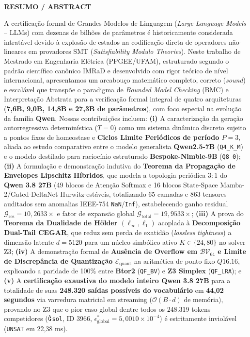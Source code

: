 \documentclass[11pt,a4paper]{article}
\theoremstyle{definition}
\begin{document}
\begin{titlepage}
    \vspace{0.55cm}
    \begin{minipage}{0.98\textwidth}
        \footnotesize
        \begin{center}\textbf{RESUMO / ABSTRACT}\end{center}
        \noindent A certificação formal de Grandes Modelos de Linguagem (\textit{Large Language Models} -- LLMs) com dezenas de bilhões de parâmetros é historicamente considerada intratável devido à explosão de estados na codificação direta de operadores não-lineares em provadores SMT (\textit{Satisfiability Modulo Theories}). Neste trabalho de Mestrado em Engenharia Elétrica (PPGEE/UFAM), estruturado segundo o padrão científico canônico IMRaD e desenvolvido com rigor teórico de nível internacional, apresentamos um arcabouço matemático completo, correto (\textit{sound}) e escalável que transpõe o paradigma de \textit{Bounded Model Checking} (BMC) e Interpretação Abstrata para a verificação formal integral de quatro arquiteturas (\textbf{7,6B, 9,0B, 14,8B e 27,3B de parâmetros}), com foco especial na evolução da família \textbf{Qwen}. Nossas contribuições incluem: \textbf{(i)} A caracterização da geração autorregressiva determinística ($T=0$) como um sistema dinâmico discreto sujeito a pontos fixos de homeostase e \textbf{Ciclos Limite Periódicos de período $P=3$}, aliada ao estudo comparativo entre o modelo generalista \textbf{Qwen2.5-7B} (\texttt{Q4\_K\_M}) e o modelo destilado para raciocínio estruturado \textbf{Bespoke-Nimble-9B} (\texttt{Q8\_0}); \textbf{(ii)} A formulação e demonstração indutiva do \textbf{Teorema da Propagação de Envelopes Lipschitz Híbridos}, que modela a topologia periódica $3:1$ do \textbf{Qwen 3.8 27B} (49 blocos de Atenção Softmax e 16 blocos State-Space Mamba-2/Gated-DeltaNet Hurwitz-estáveis, totalizando 65 camadas e 863 tensores auditados sem anomalias IEEE-754 \texttt{NaN}/\texttt{Inf}), estabelecendo ganho residual $\mathcal{G}_{\text{res}} = 10{,}2633\times$ e fator de expansão global $\mathcal{G}_{\text{total}} = 19{,}9533\times$; \textbf{(iii)} A prova do \textbf{Teorema da Dualidade de Hölder $(\ell_\infty, \ell_1)$} acoplada à \textbf{Decomposição Dual-Tail CEGAR}, que reduz sem perda de exatidão (\textit{lossless tightness}) a dimensão latente $d=5120$ para um núcleo simbólico ativo $K \in \{24, 80\}$ no solver Z3; \textbf{(iv)} A demonstração formal de \textbf{Ausência de Overflow em $\mathcal{BV}_{64}$ e Limite de Discrepância de Quantização $\mathcal{E}_{\text{quant}}$} na aritmética de ponto fixo $Q16.16$, explicando a paridade de 100\% entre \textbf{Btor2} (\texttt{QF\_BV}) e \textbf{Z3 Simplex} (\texttt{QF\_LRA}); e \textbf{(v)} A \textbf{certificação exaustiva do modelo inteiro Qwen 3.8 27B} para a totalidade de suas \textbf{248.320 saídas possíveis do vocabulário} em \textbf{44,02 segundos} via varredura matricial em streaming ($\mathcal{O}(B \cdot d)$ de memória), provando no Z3 que o pior caso global dentre todos os 248.319 tokens competidores ($\dot{\text{\texttt{G}}}$\texttt{sol}, ID 3966, $\epsilon_{\text{global}}^* = 5{,}0010 \times 10^{-4}$) é estritamente inviolável (\texttt{UNSAT} em 22,38 ms).
    \end{minipage}
    

\end{titlepage}
\end{document}

